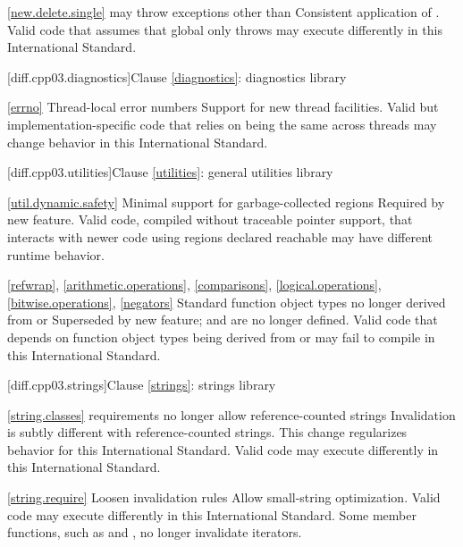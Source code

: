 \ref{new.delete.single}
\change {} may throw exceptions other than
\rationale Consistent application of .
\effect
Valid \CppIII code that assumes that global  only
throws  may execute differently in this International
Standard.

[diff.cpp03.diagnostics]{Clause \ref{diagnostics}: diagnostics library}

\ref{errno}
\change Thread-local error numbers
\rationale Support for new thread facilities.
\effect Valid but implementation-specific \CppIII code that relies on
 being the same across threads may change behavior in this
International Standard.

[diff.cpp03.utilities]{Clause \ref{utilities}: general utilities library}

\ref{util.dynamic.safety}
\change Minimal support for garbage-collected regions
\rationale Required by new feature.
\effect
Valid \CppIII code, compiled without traceable pointer support,
that interacts with newer \Cpp code using regions declared reachable may
have different runtime behavior.

\ref{refwrap}, \ref{arithmetic.operations}, \ref{comparisons},
\ref{logical.operations}, \ref{bitwise.operations}, \ref{negators}
\change Standard function object types no longer derived from
 or 
\rationale Superseded by new feature;  and
 are no longer defined.
\effect
Valid \CppIII code that depends on function object types being derived from
 or  may fail to compile
in this International Standard.

[diff.cpp03.strings]{Clause \ref{strings}: strings library}

\ref{string.classes}
\change {} requirements no longer allow reference-counted
strings
\rationale Invalidation is subtly different with reference-counted strings.
This change regularizes behavior for this International Standard.
\effect
Valid \CppIII code may execute differently in this International Standard.

\ref{string.require}
\change Loosen  invalidation rules
\rationale Allow small-string optimization.
\effect
Valid \CppIII code may execute differently in this International Standard.
Some  member functions, such as  and ,
no longer invalidate iterators.

